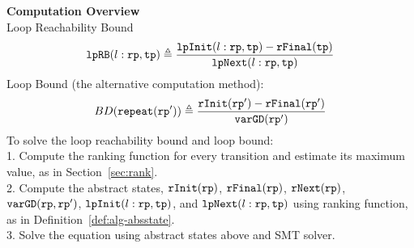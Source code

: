 \textbf{Computation Overview}
\\
 Loop Reachability Bound
\[
  \mathtt{lpRB}(l: \mathtt{rp}, \mathtt{tp}) \triangleq
    \frac{\mathtt{lpInit}(l: \mathtt{rp}, \mathtt{tp}) - \mathtt{rFinal}(\mathtt{tp})}{\mathtt{lpNext}(l: \mathtt{rp}, \mathtt{tp})}
\]
 Loop Bound (the alternative computation method):
  \[
    BD(\mathtt{repeat}(\mathtt{rp}')) \triangleq
    \frac{\mathtt{rInit}(\mathtt{rp}') - \mathtt{rFinal}(\mathtt{rp}')}{\mathtt{varGD}(\mathtt{rp}')}
\]
  To solve the loop reachability bound and loop bound:
  \\
  1. Compute the ranking function for every transition and estimate its maximum value, as in Section~\ref{sec:rank}.
  \\
  2. Compute the abstract states,
  $\mathtt{rInit}(\mathtt{rp})$, $\mathtt{rFinal}(\mathtt{rp})$, $\mathtt{rNext}(\mathtt{rp})$, $\mathtt{varGD}(\mathtt{rp}, \mathtt{rp}')$, 
  $\mathtt{lpInit}(l: \mathtt{rp}, \mathtt{tp})$, and $\mathtt{lpNext}(l: \mathtt{rp}, \mathtt{tp})$ using ranking function,
  as in Definition~\ref{def:alg-absstate}.
  \\
  3. Solve the equation using abstract states above and SMT solver.
